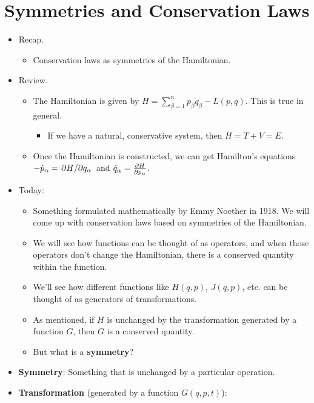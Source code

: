\documentclass[../notes.tex]{subfiles}
\begin{document}
\section{Symmetries and Conservation Laws}
\begin{itemize}
    \item {}Recap.
    \begin{itemize}
        \item Conservation laws as symmetries of the Hamiltonian.
    \end{itemize}
    \item Review.
    \begin{itemize}
        \item The Hamiltonian is given by $H=\sum_{\beta=1}^np_\beta\dot{q}_\beta-L(p,q)$. This is true in general.
        \begin{itemize}
            \item If we have a natural, conservative system, then $H=T+V=E$.
        \end{itemize}
        \item Once the Hamiltonian is constructed, we can get Hamilton's equations $-\dot{p}_\alpha=\pdv*{H}{q_\alpha}$ and $\dot{q}_\alpha=\pdv{H}{p_\alpha}$.
    \end{itemize}
    \item Today:
    \begin{itemize}
        \item Something formulated mathematically by Emmy Noether in 1918. We will come up with conservation laws based on symmetries of the Hamiltonian.
        \item We will see how functions can be thought of as operators, and when those operators don't change the Hamiltonian, there is a conserved quantity within the function.
        \item We'll see how different functions like $H(q,p)$, $J(q,p)$, etc. can be thought of as generators of transformations.
        \item As mentioned, if $H$ is unchanged by the transformation generated by a function $G$, then $G$ is a conserved quantity.
        \item But what is a \textbf{symmetry}?
    \end{itemize}
    \item \textbf{Symmetry}: Something that is unchanged by a particular operation.
    \item \textbf{Transformation} (generated by a function $G(q,p,t)$):
    \begin{align*}

\end{align*}
\end{itemize}
\end{document}
